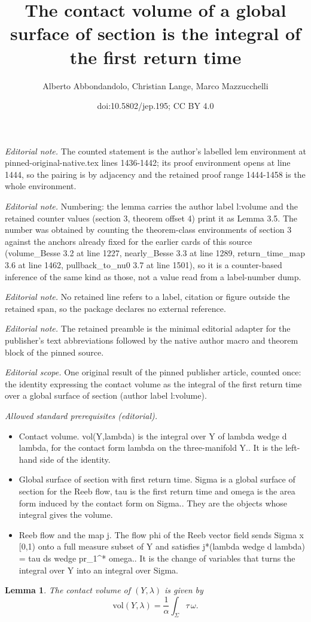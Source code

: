 \documentclass[10pt,a4paper]{article}
\title{The contact volume of a global surface of section is the integral of the first return time}
\author{Alberto Abbondandolo, Christian Lange, Marco Mazzucchelli}
\date{doi:10.5802/jep.195; CC BY 4.0}
\newtheorem{lem}[thm]{Lemma}
\theoremstyle{definition}
\newcommand{\vol}{\mathrm{vol}}
\begin{document}
\maketitle
\setcounter{section}{3}
\setcounter{thm}{4}
\noindent\textit{Editorial note.} The counted statement is the author's labelled lem environment at pinned-original-native.tex lines 1436-1442; its proof environment opens at line 1444, so the pairing is by adjacency and the retained proof range 1444-1458 is the whole environment.\par\medskip
\noindent\textit{Editorial note.} Numbering: the lemma carries the author label l:volume and the retained counter values (section 3, theorem offset 4) print it as Lemma 3.5. The number was obtained by counting the theorem-class environments of section 3 against the anchors already fixed for the earlier cards of this source (volume\_Besse 3.2 at line 1227, nearly\_Besse 3.3 at line 1289, return\_time\_map 3.6 at line 1462, pullback\_to\_nu0 3.7 at line 1501), so it is a counter-based inference of the same kind as those, not a value read from a label-number dump.\par\medskip
\noindent\textit{Editorial note.} No retained line refers to a label, citation or figure outside the retained span, so the package declares no external reference.\par\medskip
\noindent\textit{Editorial note.} The retained preamble is the minimal editorial adapter for the publisher's text abbreviations followed by the native author macro and theorem block of the pinned source.\par\medskip
\noindent\textit{Editorial scope.} One original result of the pinned publisher article, counted once: the identity expressing the contact volume as the integral of the first return time over a global surface of section (author label l:volume).\par\medskip
\noindent\textit{Allowed standard prerequisites (editorial).}\begin{itemize}
\item Contact volume. vol(Y,lambda) is the integral over Y of lambda wedge d lambda, for the contact form lambda on the three-manifold Y.. It is the left-hand side of the identity.
\item Global surface of section with first return time. Sigma is a global surface of section for the Reeb flow, tau is the first return time and omega is the area form induced by the contact form on Sigma.. They are the objects whose integral gives the volume.
\item Reeb flow and the map j. The flow phi of the Reeb vector field sends Sigma x [0,1) onto a full measure subset of Y and satisfies j*(lambda wedge d lambda) = tau ds wedge pr\_1\textasciicircum{}* omega.. It is the change of variables that turns the integral over Y into an integral over Sigma.
\end{itemize}\medskip
\begin{lem}
\label{l:volume}
The contact volume of $(Y,\lambda)$ is given by
\[
\vol(Y,\lambda) = \frac1\alpha \int_\Sigma \tau\,\omega.
\]
\end{lem}
\end{document}
